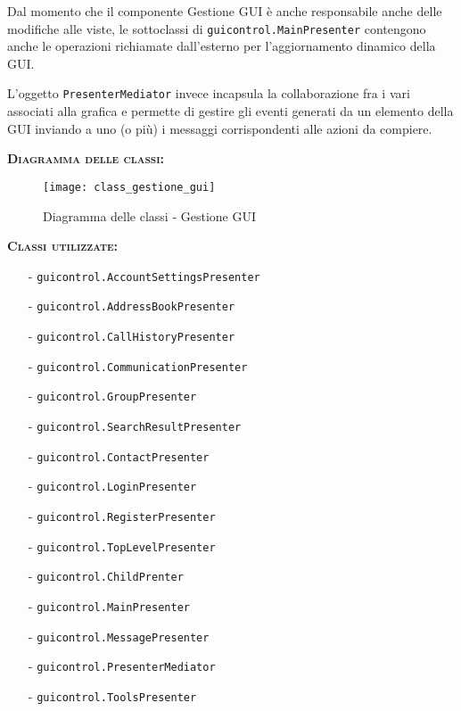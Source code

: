 \begin{description}
Dal momento che il componente \textsf{Gestione GUI} è anche responsabile anche delle modifiche alle viste, le sottoclassi di \texttt{guicontrol.MainPresenter} contengono anche le operazioni richiamate dall'esterno per l'aggiornamento dinamico della GUI\@.

L'oggetto \texttt{PresenterMediator} invece incapsula la collaborazione fra i vari  associati alla grafica e permette di gestire gli eventi generati da un elemento della GUI inviando a uno (o più)  i messaggi corrispondenti alle azioni da compiere.

	\item{\scshape\bfseries Diagramma delle classi:}\\
  \begin{figure}[H]
    \centering
    \texttt{[image: class\_gestione\_gui]}
    \caption{Diagramma delle classi - Gestione GUI}\label{fig:gestionegui}
  \end{figure}

	\item{\scshape\bfseries Classi utilizzate:}\\
	\begin{itemize}[noitemsep,nolistsep]
	  \item[-] \texttt{guicontrol.AccountSettingsPresenter}
	  \item[-] \texttt{guicontrol.AddressBookPresenter}
	  \item[-] \texttt{guicontrol.CallHistoryPresenter}
	  \item[-] \texttt{guicontrol.CommunicationPresenter}
	  \item[-] \texttt{guicontrol.GroupPresenter}	 
	  \item[-] \texttt{guicontrol.SearchResultPresenter}	   
	  \item[-] \texttt{guicontrol.ContactPresenter}
	  \item[-] \texttt{guicontrol.LoginPresenter}
	  \item[-] \texttt{guicontrol.RegisterPresenter}	 
	  \item[-] \texttt{guicontrol.TopLevelPresenter}	  
	  \item[-] \texttt{guicontrol.ChildPrenter}	  
	  \item[-] \texttt{guicontrol.MainPresenter}
		\item[-] \texttt{guicontrol.MessagePresenter}
		\item[-] \texttt{guicontrol.PresenterMediator}
	  \item[-] \texttt{guicontrol.ToolsPresenter}
	\end{itemize}
\end{description}

